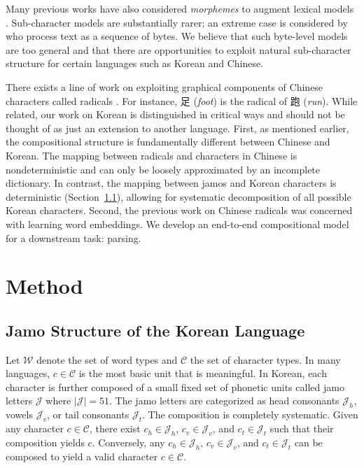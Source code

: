 \documentclass[11pt,letterpaper]{article}
\newcommand{\abs}[1]{\left|#1\right|}
\begin{document}
\begin{CJK}{UTF8}{gbsn}
Many previous works have also considered \textit{morphemes} to augment lexical models \cite{luong2013better,botha2014compositional,cotterell2016morphological}.
Sub-character models are substantially rarer; an extreme case is considered by
 who process text as a sequence of bytes.
We believe that such byte-level models are too general and that there are opportunities to exploit
natural sub-character structure for certain languages such as Korean and Chinese.

There exists a line of work on exploiting graphical components of Chinese characters called radicals \citep{sun2014radical,yinmulti}.
For instance, 足 (\textit{foot}) is the radical of 跑 (\textit{run}).
While related, our work on Korean is distinguished in critical ways and should not be thought of as just an extension to another language.
First, as mentioned earlier, the compositional structure is fundamentally different between Chinese and Korean.
The mapping between radicals and characters in Chinese is nondeterministic and can only be loosely approximated by an incomplete dictionary.
In contrast, the mapping between jamos and Korean characters is deterministic (Section~\ref{subsec:jamo}),
allowing for systematic decomposition of all possible Korean characters.
Second, the previous work on Chinese radicals was concerned with learning word embeddings.
We develop an end-to-end compositional model for a downstream task: parsing.

\section{Method}

\subsection{Jamo Structure of the Korean Language}
\label{subsec:jamo}

Let $\mathcal{W}$ denote the set of word types and $\mathcal{C}$ the set of character types.
In many languages, $c \in \mathcal{C}$ is the most basic unit that is meaningful.
In Korean, each character is further composed of a small fixed set of phonetic units called jamo letters $\mathcal{J}$ where $\abs{\mathcal{J}} = 51$.
The jamo letters are categorized as head consonants $\mathcal{J}_h$, vowels $\mathcal{J}_v$, or tail consonants $\mathcal{J}_t$.
The composition is completely systematic.
Given any character $c \in \mathcal{C}$, there exist $c_h \in \mathcal{J}_h$, $c_v \in \mathcal{J}_v$, and $c_t \in \mathcal{J}_t$ such that their composition yields $c$.
Conversely, any $c_h \in \mathcal{J}_h$, $c_v \in \mathcal{J}_v$, and $c_t \in \mathcal{J}_t$ can be composed to yield a valid character $c \in \mathcal{C}$.


\end{CJK}
\end{document}
